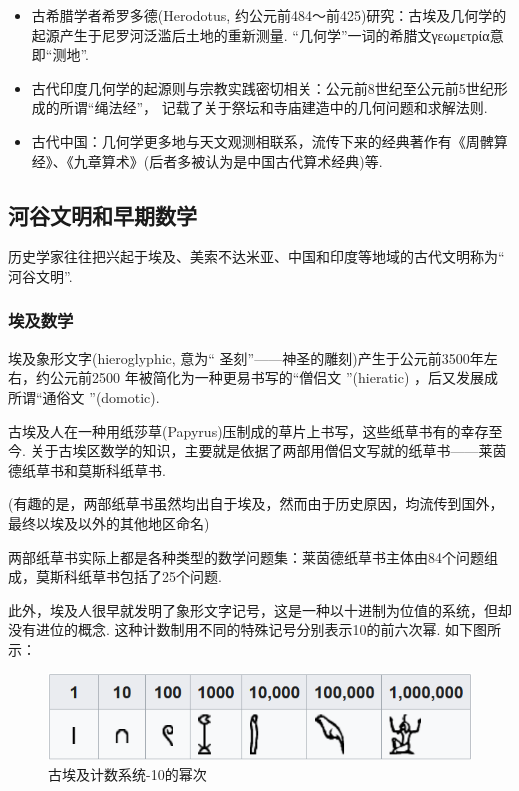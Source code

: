\documentclass{Math_Note}
\begin{document}
\begin{itemize}
    \item 古希腊学者希罗多德(Herodotus, 约公元前484～前425)研究：古埃及几何学的起源产生于尼罗河泛滥后土地的重新测量. 
    “几何学”一词的希腊文γεωμετρία意即“测地”.
    \item 古代印度几何学的起源则与宗教实践密切相关：公元前8世纪至公元前5世纪形成的所谓“绳法经”，
    记载了关于祭坛和寺庙建造中的几何问题和求解法则.
    \item 古代中国：几何学更多地与天文观测相联系，流传下来的经典著作有《周髀算经》、《九章算术》(后者多被认为是中国古代算术经典)等.
\end{itemize}

\subsection{河谷文明和早期数学}
历史学家往往把兴起于埃及、美索不达米亚、中国和印度等地域的古代文明称为“ 河谷文明”.
\subsubsection{埃及数学}
埃及象形文字(hieroglyphic, 意为“ 圣刻”——神圣的雕刻)产生于公元前3500年左右，约公元前2500 年被简化为一种更易书写的“僧侣文 ”(hieratic) ，后又发展成所谓“通俗文 ”(domotic).

古埃及人在一种用纸莎草(Papyrus)压制成的草片上书写，这些纸草书有的幸存至今. 关于古埃区数学的知识，主要就是依据了两部用僧侣文写就的纸草书——莱茵德纸草书和莫斯科纸草书. 

(有趣的是，两部纸草书虽然均出自于埃及，然而由于历史原因，均流传到国外，最终以埃及以外的其他地区命名)

两部纸草书实际上都是各种类型的数学问题集：莱茵德纸草书主体由84个问题组成，莫斯科纸草书包括了25个问题.

此外，埃及人很早就发明了象形文字记号，这是一种以十进制为位值的系统，但却没有进位的概念. 这种计数制用不同的特殊记号分别表示10的前六次幂. 如下图所示：

\begin{figure}[H]
    \centering
    \includegraphics[scale=0.8]{"./Figures/Ancient_Egyptian_Math_1.png"} %
    \caption{古埃及计数系统-10的幂次}
\end{figure}
\end{document}
